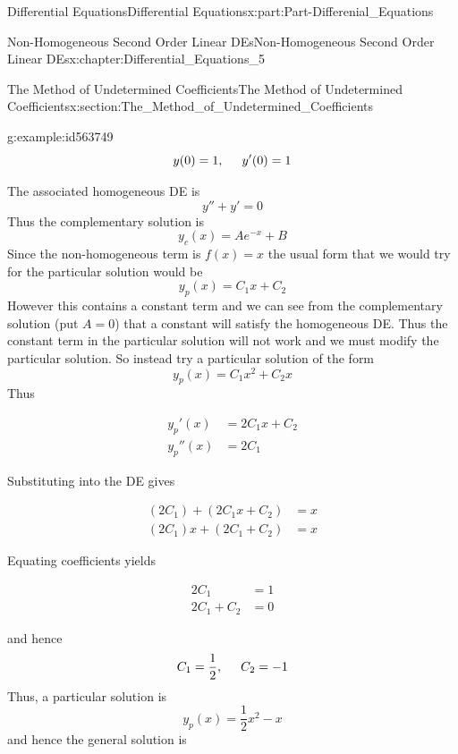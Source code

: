 \documentclass[oneside,10pt,]{book}
\numberwithin{equation}{section}
\newcommand{\amp}{&}
\begin{document}
\begin{partptx}{Differential Equations}{}{Differential Equations}{}{}{x:part:Part-Differenial_Equations}
\begin{chapterptx}{Non-Homogeneous Second Order Linear DEs}{}{Non-Homogeneous Second Order Linear DEs}{}{}{x:chapter:Differential_Equations_5}
\begin{sectionptx}{The Method of Undetermined Coefficients}{}{The Method of Undetermined Coefficients}{}{}{x:section:The_Method_of_Undetermined_Coefficients}
\begin{example}{}{g:example:id563749}
\begin{equation*}
y(0)=1,\hspace{5mm} y'(0)=1
\end{equation*}
%
\par\smallskip%
\noindent\hypertarget{g:solution:id563781}{}The associated homogeneous DE is%
\begin{equation*}
y''+y'=0
\end{equation*}
Thus the complementary solution is%
\begin{equation*}
y_c(x)=Ae^{-x}+B
\end{equation*}
Since the non-homogeneous term is \(f(x)=x\) the usual form that we would try for the particular solution would be%
\begin{equation*}
y_p(x)=C_1x+C_2
\end{equation*}
However this contains a constant term and we can see from the complementary solution (put \(A=0\)) that a constant will satisfy the homogeneous DE. Thus the constant term in the particular solution will not work and we must modify the particular solution. So instead try a particular solution of the form%
\begin{equation*}
y_p(x)=C_1x^2+C_2x
\end{equation*}
Thus%
\par
%
\begin{align*}
y_p'(x) \amp=2C_1x+C_2\\
y_p''(x) \amp=2C_1
\end{align*}
%
\par
Substituting into the DE gives%
\par
%
\begin{align*}
(2C_1)+(2C_1x+C_2) \amp =x\\
(2C_1)x+(2C_1+C_2) \amp =x
\end{align*}
%
\par
Equating coefficients yields%
\par
%
\begin{align*}
2C_1 \amp =1\\
2C_1+C_2 \amp =0
\end{align*}
%
\par
and hence%
\begin{equation*}
C_1=\frac{1}{2},\hspace{5mm} C_2=-1
\end{equation*}
Thus, a particular solution is%
\begin{equation*}
y_p(x)=\frac{1}{2}x^2-x
\end{equation*}
and hence the general solution is%
\begin{equation*}

\end{equation*}
\end{example}
\end{sectionptx}
\end{chapterptx}
\end{partptx}
\end{document}
